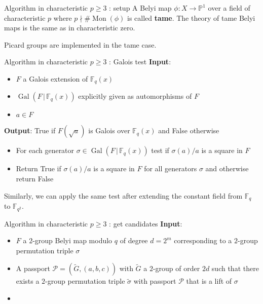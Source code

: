 \documentclass[xcolor=dvipsnames]{beamer}
\theoremstyle{plain}
\newcommand{\PP}{\mathbb P}
\newcommand{\wt}[1]{\widetilde{#1}}
\newcommand{\FF}{\mathbb{F}}
\DeclareMathOperator{\Mon}{Mon}
\DeclareMathOperator{\Gal}{Gal}
\begin{document}
{\begin{frame}{Algorithm in characteristic $p\geq 3$ : setup}
      A Belyi map $\phi\colon X\to\PP^1$ over a field of
      characteristic $p$ where $p\nmid\#\Mon(\phi)$
      is called \textbf{tame}.
      The theory of tame Belyi maps is the same as in
      characteristic zero.
      \pause\par
      Picard groups are implemented in the tame case.
    \end{frame}
    \begin{frame}{Algorithm in characteristic $p\geq 3$ : Galois test}
      \textbf{Input}:
      \begin{itemize}
        \item
          $F$ a Galois extension of $\FF_q(x)$
        \item
          $\Gal(F\,|\,\FF_q(x))$ explicitly given as automorphisms of $F$
        \item
          $a\in F$
      \end{itemize}
      \textbf{Output}:
      True if $F(\sqrt{a})$ is Galois over $\FF_q(x)$
      and False otherwise
      \pause\par
      \begin{itemize}
        \item
          For each generator $\sigma\in\Gal(F\,|\,\FF_q(x))$
          test if $\sigma(a)/a$ is a square in $F$
        \item
          Return True if $\sigma(a)/a$ is a square in $F$
          for all generators $\sigma$
          and otherwise return False
      \end{itemize}
      \pause\par
      Similarly, we can apply the same test after
      extending the constant field from $\FF_q$
      to $\FF_{q^2}$.
    \end{frame}
    \begin{frame}{Algorithm in characteristic $p\geq 3$ : get candidates}
      \textbf{Input}:
      \begin{itemize}
        \item 
          $F$
          a $2$-group Belyi map modulo $q$
          of degree $d=2^m$
          corresponding to a $2$-group
          permutation triple $\sigma$
        \item
          A passport
          $\mathcal{P}=(\wt{G},(a,b,c))$
          with $\wt{G}$ a $2$-group of order
          $2d$ such that there
          exists a
          $2$-group permutation triple
          $\wt{\sigma}$ with passport
          $\mathcal{P}$
          that is a lift of
          $\sigma$
        \item

\end{itemize}
\end{frame}}
\end{document}
